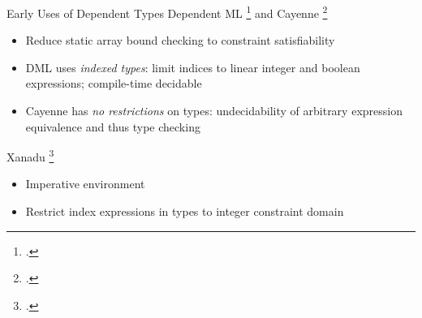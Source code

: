 \documentclass[aspectratio=169]{beamer}
\begin{document}
\begin{frame}{Early Uses of Dependent Types}
Dependent ML \footcite{xi_eliminating_1998} and Cayenne \footcite{augustsson_cayennelanguage_1998}
\begin{itemize}
    \item Reduce static array bound checking to constraint satisfiability
    \item DML uses \emph{indexed types}: limit indices to linear integer and boolean expressions; compile-time decidable
    \item Cayenne has \emph{no restrictions} on types: undecidability of arbitrary expression equivalence and thus type checking 
\end{itemize}
Xanadu \footcite{xi_imperative_2000}
\begin{itemize}
    \item Imperative environment
    \item Restrict index expressions in types to integer constraint domain 
\end{itemize}
    \vspace{0.2in}
\end{frame}

\end{document}
